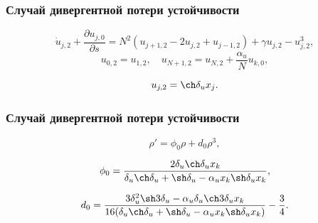 \documentclass[fullscreen=true, unicode, bookmarks=false]{beamer}
\begin{document}
\begin{frame}
\frametitle{ Случай дивергентной потери устойчивости }

\begin{equation}
	\dot u_{j,2} + \frac{\partial u_{j,0}}{\partial s} = N^2(u_{j+1,2} - 2u_{j,2} + u_{j-1,2}) + \gamma u_{j,2} - u_{j,2}^3,
\end{equation}
\begin{equation}
	u_{0,2} = u_{1,2}, \quad u_{N+1,2} = u_{N,2} + \dfrac{\alpha_u}{N}u_{k,0},
\end{equation}

\bigskip

$$ u_{j,2} = \ch \delta_u x_j. $$

\end{frame}

\begin{frame}
\frametitle{ Случай дивергентной потери устойчивости }

\begin{equation}
	\rho' = \phi_0 \rho + d_0 \rho^3,
\end{equation}

\bigskip

\begin{equation}\label{phi0_div}
\phi_0 = \frac{ 2 \delta_u \ch \delta_u x_k }{ \delta_u \ch \delta_u +\sh \delta_u - \alpha_u x_k \sh \delta_u x_k },
\end{equation}

\begin{equation}\label{d0_div}
d_0 = \frac{ 3\delta_u^2 \sh 3\delta_u - \alpha_u \delta_u \ch 3\delta_u x_k }{ 16( \delta_u \ch \delta_u +\sh \delta_u - \alpha_u x_k \sh \delta_u x_k ) } - \frac{3}{4}.
\end{equation}

\end{frame}
\end{document}
